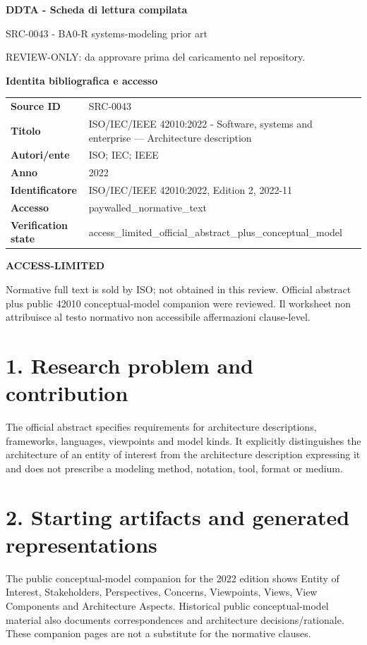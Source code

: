 \documentclass[10pt,a4paper]{article}
\newenvironment{factbox}[1]{\def\FrameCommand{\fcolorbox{ddtablue}{ddtagray}}\MakeFramed{\advance\hsize-2\width\FrameRestore}\noindent\textbf{#1}\par\smallskip}{\endMakeFramed}
\newenvironment{challenge}[1]{\def\FrameCommand{\fcolorbox{ddtaorange}{ddtagray}}\MakeFramed{\advance\hsize-2\width\FrameRestore}\noindent\textbf{#1}\par\smallskip}{\endMakeFramed}
\begin{document}
\begin{center}
{\LARGE\bfseries DDTA - Scheda di lettura compilata}\par
{\large SRC-0043 - BA0-R systems-modeling prior art}\par
{\small REVIEW-ONLY: da approvare prima del caricamento nel repository.}\par
\end{center}
\begin{factbox}{Identita bibliografica e accesso}
\begin{tabularx}{\linewidth}{>{\bfseries}p{3.4cm}X}
Source ID & SRC-0043\\
Titolo & ISO/IEC/IEEE 42010:2022 - Software, systems and enterprise — Architecture description\\
Autori/ente & ISO; IEC; IEEE\\
Anno & 2022\\
Identificatore & ISO/IEC/IEEE 42010:2022, Edition 2, 2022-11\\
Accesso & paywalled\_normative\_text\\
Verification state & access\_limited\_official\_abstract\_plus\_conceptual\_model\\
\end{tabularx}
\end{factbox}
\begin{challenge}{ACCESS-LIMITED}
Normative full text is sold by ISO; not obtained in this review. Official abstract plus public 42010 conceptual-model companion were reviewed. Il worksheet non attribuisce al testo normativo non accessibile affermazioni clause-level.
\end{challenge}
\section{1. Research problem and contribution}
The official abstract specifies requirements for architecture descriptions, frameworks, languages, viewpoints and model kinds. It explicitly distinguishes the architecture of an entity of interest from the architecture description expressing it and does not prescribe a modeling method, notation, tool, format or medium.
\section{2. Starting artifacts and generated representations}
The public conceptual-model companion for the 2022 edition shows Entity of Interest, Stakeholders, Perspectives, Concerns, Viewpoints, Views, View Components and Architecture Aspects. Historical public conceptual-model material also documents correspondences and architecture decisions/rationale. These companion pages are not a substitute for the normative clauses.
\end{document}
